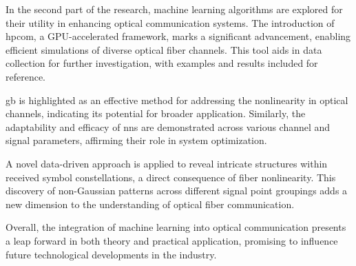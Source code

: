 
In the second part of the research, machine learning algorithms are explored for their utility in enhancing optical communication systems. The introduction of \acrfull{hpcom}, a GPU-accelerated framework, marks a significant advancement, enabling efficient simulations of diverse optical fiber channels. This tool aids in data collection for further investigation, with examples and results included for reference.

\acrfull{gb} is highlighted as an effective method for addressing the nonlinearity in optical channels, indicating its potential for broader application. Similarly, the adaptability and efficacy of \acrshort{nn}s are demonstrated across various channel and signal parameters, affirming their role in system optimization.

A novel data-driven approach is applied to reveal intricate structures within received symbol constellations, a direct consequence of fiber nonlinearity. This discovery of non-Gaussian patterns across different signal point groupings adds a new dimension to the understanding of optical fiber communication.

Overall, the integration of machine learning into optical communication presents a leap forward in both theory and practical application, promising to influence future technological developments in the industry.

